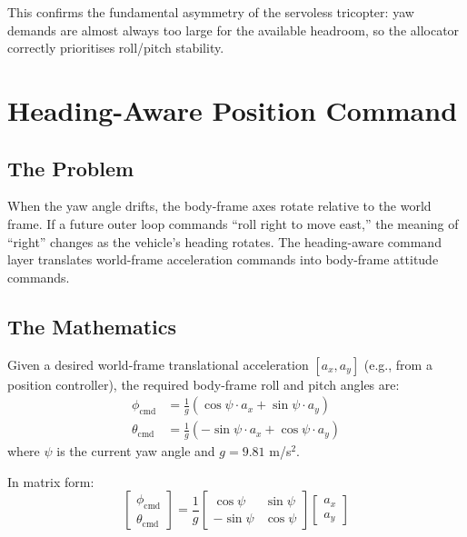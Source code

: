\documentclass[12pt, a4paper]{article}
\begin{document}
This confirms the fundamental asymmetry of the servoless tricopter: yaw demands are almost always too large for the available headroom, so the allocator correctly prioritises roll/pitch stability.

\section{Heading-Aware Position Command}
\label{sec:heading_cmd}

\subsection{The Problem}

When the yaw angle drifts, the body-frame axes rotate relative to the world frame.  If a future outer loop commands ``roll right to move east,'' the meaning of ``right'' changes as the vehicle's heading rotates.  The heading-aware command layer translates world-frame acceleration commands into body-frame attitude commands.

\subsection{The Mathematics}

Given a desired world-frame translational acceleration $[a_x, a_y]$ (e.g., from a position controller), the required body-frame roll and pitch angles are:
\begin{align}
    \phi_{\text{cmd}} &= \frac{1}{g} \left( \cos\psi \cdot a_x + \sin\psi \cdot a_y \right) \\
    \theta_{\text{cmd}} &= \frac{1}{g} \left( -\sin\psi \cdot a_x + \cos\psi \cdot a_y \right)
\end{align}
where $\psi$ is the current yaw angle and $g = 9.81$ m/s$^2$.

In matrix form:
\begin{equation}
    \begin{bmatrix} \phi_{\text{cmd}} \\ \theta_{\text{cmd}} \end{bmatrix}
    = \frac{1}{g}
    \begin{bmatrix} \cos\psi & \sin\psi \\ -\sin\psi & \cos\psi \end{bmatrix}
    \begin{bmatrix} a_x \\ a_y \end{bmatrix}
\end{equation}
\end{document}
